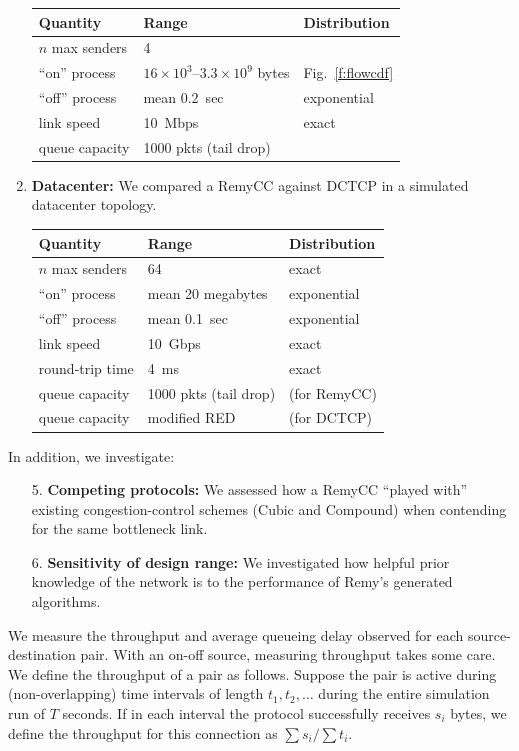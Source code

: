 \begin{enumerate}
\begin{tabular}{lll}
\bf Quantity & \bf Range & \bf Distribution \\
\hline $n$ max senders & 4 \\
``on'' process & $16 \times 10^3$--$3.3 \times 10^9$ bytes & Fig.~\ref{f:flowcdf}\\
``off'' process & mean 0.2~sec & exponential \\
link speed & 10~Mbps & exact \\
queue capacity & 1000 pkts (tail drop) \\
\end{tabular}

\item {\bf Datacenter:} We compared a RemyCC against
  DCTCP in a simulated datacenter topology.

\begin{tabular}{lll}
\bf Quantity & \bf Range & \bf Distribution \\
\hline $n$ max senders & 64 & exact \\
``on'' process & mean 20 megabytes & exponential \\
``off'' process & mean 0.1~sec & exponential \\
link speed & 10~Gbps & exact \\
round-trip time & 4~ms & exact \\
queue capacity & 1000 pkts (tail drop) & (for RemyCC) \\
queue capacity & modified RED & (for DCTCP) \\
\end{tabular}

\end{enumerate}

In addition, we investigate:
\begin{enumerate} 
\item[5.] {\bf Competing protocols:} We assessed how a RemyCC ``played with''
  existing congestion-control schemes (Cubic and Compound) when contending
  for the same bottleneck link.
\item [6.] {\bf Sensitivity of design range:} We investigated how
  helpful prior knowledge of the network is to the performance of
  Remy's generated algorithms.
\end{enumerate}


\medskip
{}  We measure the throughput and average
queueing delay observed for each source-destination pair. With an
on-off source, measuring throughput takes some care.  We define the
throughput of a pair as follows. Suppose the pair is active during
(non-overlapping) time intervals of length $t_1, t_2, \ldots$ during
the entire simulation run of $T$ seconds. If in each interval the
protocol successfully receives $s_i$ bytes, we define the throughput
for this connection as $\sum s_i / \sum t_i$.%

